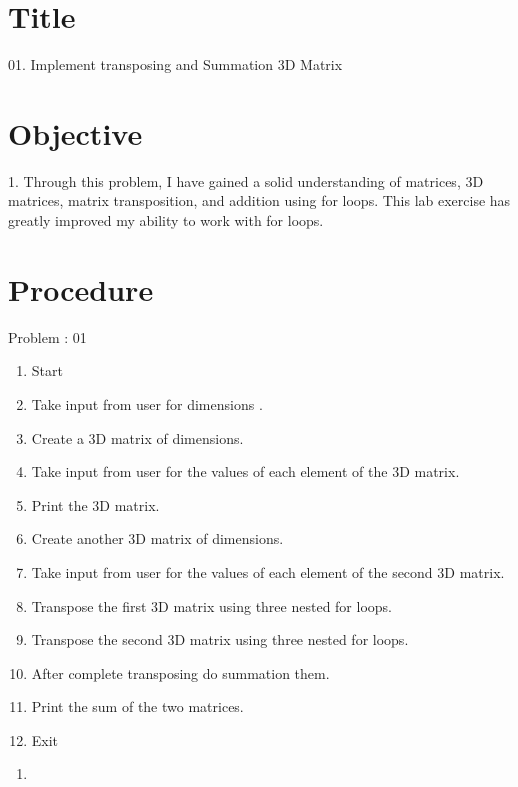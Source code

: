\documentclass{article}
\begin{document}
\clearpage

\section{Title}
\Large 01. Implement transposing and Summation 3D Matrix \newline
\
\section{Objective}
\large 1. Through this problem, I have gained a solid understanding of matrices, 3D matrices, matrix transposition, and addition using for loops. This lab exercise has greatly improved my ability to work with for loops.

\section{Procedure}
\Large Problem : 01
\begin{enumerate}
\item Start
\item Take input from user for dimensions .
\item Create a 3D matrix of dimensions.
\item Take input from user for the values of each element of the 3D matrix.
\item Print the 3D matrix.
\item Create another 3D matrix of dimensions.
\item Take input from user for the values of each element of the second 3D matrix.
\item Transpose the first 3D matrix using three nested for loops.
\item Transpose the second 3D matrix using three nested for loops.
\item After complete transposing do summation them.
\item Print the sum of the two matrices.
\item Exit

\end{enumerate}


\begin{enumerate}
    \item 
    
\end{enumerate}
\end{document}
